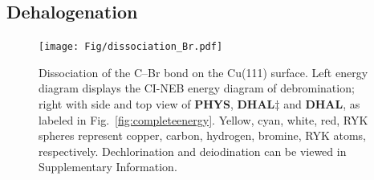 \documentclass[%
 reprint,
 amsmath,amssymb,
 aps,
prb,
floatfix,
]{revtex4-2}
\newcommand{\sinfo}{Supplementary Information}
\begin{document}
\ifdefined\INTERNAL
\subsection{Dehalogenation}
\fi

\begin{figure}[hbt]
\centering
\texttt{[image: Fig/dissociation\_Br.pdf]}
\caption{Dissociation of the C--Br bond on the Cu(111) surface. Left energy diagram displays the CI-NEB energy diagram of debromination; right with side and top view of \textbf{PHYS}, \textbf{DHAL$\ddagger$} and \textbf{DHAL}, as labeled in Fig.~\ref{fig:completeenergy}. Yellow, cyan, white, red, RYK spheres represent copper, carbon, hydrogen, bromine, RYK atoms, respectively. Dechlorination and deiodination can be viewed in \sinfo.}
\label{fig:dissociation_Br}
\end{figure}
\end{document}
